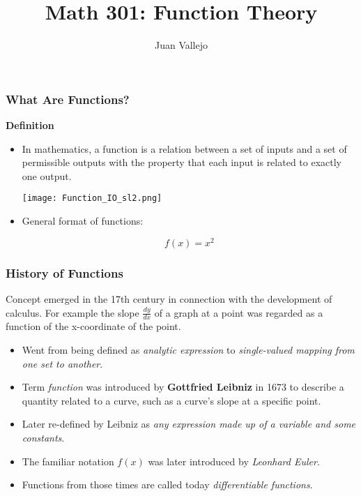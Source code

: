 \documentclass{beamer}
\begin{document}
\begin{frame}
  \title{Math 301: Function Theory}
  \author{Juan Vallejo}
  \maketitle
\end{frame}

\begin{frame}[fragile]\frametitle{What Are Functions?}
\begin{center}\textbf{Definition} \end{center}

\begin{itemize}
  \item In mathematics, a function is a relation between a set of inputs and a set of permissible outputs with the property that each input is related to exactly one output. %
  
  \vfill
  \begin{center}\texttt{[image: Function\_IO\_sl2.png]} \end{center}
  
  \vfill
  \item General format of functions:
  
  \vfill
  \begin{equation*}
    f(x) = x^2
  \end{equation*}
  \vfill

\end{itemize}

\end{frame}

\begin{frame}[fragile]\frametitle{History of Functions}
\begin{center} Concept emerged in the 17th century in connection with the development of calculus. For example the slope $\frac{dy}{dx}$ of a graph at a point was regarded as a function of the x-coordinate of the point. \end{center}

\begin{itemize}
  \item Went from being defined as \textit{analytic expression} to \textit{single-valued mapping from one set to another}.
  \item Term \textit{function} was introduced by \textbf{Gottfried Leibniz} in 1673 to describe a quantity related to a curve, such as a curve's slope at a specific point.
  \item Later re-defined by Leibniz as \textit{any expression made up of a variable and some constants}.
  \item The familiar notation $f(x)$ was later introduced by \textit{Leonhard Euler}.
  \item Functions from those times are called today \textit{differentiable functions}.
  
\end{itemize}

\end{frame}
\end{document}
